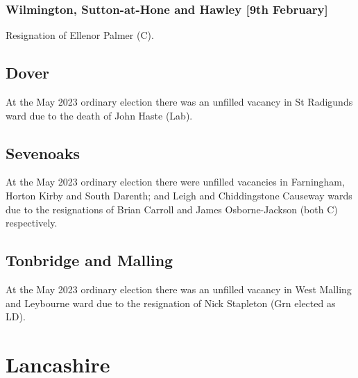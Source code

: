 \documentclass[a4paper,openany]{book}
\begin{document}
\begin{resultsiii}
\subsubsection*{Wilmington, Sutton-at-Hone and Hawley \hspace*{\fill}\nolinebreak[1]%
	\enspace\hspace*{\fill}
	[9th February]}

Resignation of Ellenor Palmer (C).


\subsection*{Dover}

At the May 2023 ordinary election there was an unfilled vacancy in St Radigunds ward due to the death of John Haste (Lab).%

\subsection*{Sevenoaks}

At the May 2023 ordinary election there were unfilled vacancies in Farningham, Horton Kirby and South Darenth; and Leigh and Chiddingstone Causeway wards due to the resignations of Brian Carroll and James Osborne-Jackson (both C) respectively.%
%

\subsection*{Tonbridge and Malling}

At the May 2023 ordinary election there was an unfilled vacancy in West Malling and Leybourne ward due to the resignation of Nick Stapleton (Grn elected as LD).%

\section{Lancashire}


\end{resultsiii}
\end{document}
